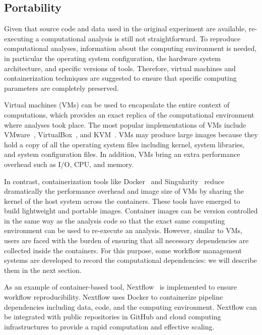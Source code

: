 \subsection{Portability}

Given that source code and data used in the original experiment are 
available, re-executing a computational analysis is still not 
straightforward. To reproduce computational analyses, information about the
computing environment is needed, in particular the operating system 
configuration, the hardware system architecture, and specific versions of 
tools. Therefore, virtual machines and containerization techniques are 
suggested to ensure that specific computing parameters are completely 
preserved. 

Virtual machines (VMs) can be used to encapsulate the entire context of 
computations, which provides an exact replica of the computational 
environment where analyses took place. The most popular implementations 
of VMs include VMware~\cite{wiki:vmware}, 
VirtualBox~\cite{watson2008virtualbox}, and KVM~\cite{kivity2007kvm}. 
VMs may produce large images because they hold a copy of all the 
operating system files including kernel, system libraries, and system 
configuration files. In addition, VMs bring an extra 
performance overhead such as I/O, CPU, and memory.

In contrast, containerization tools like 
Docker~\cite{boettiger2015introduction} and 
Singularity~\cite{kurtzer2017singularity} reduce dramatically the 
performance overhead and image size of VMs by sharing the kernel of the 
host system across the containers. These tools have emerged to build 
lightweight and portable images. Container images can be version 
controlled in the same way as the analysis code so that the exact same 
computing environment can be used to re-execute an analysis. However, 
similar to VMs, users are faced with the burden of ensuring that all 
necessary dependencies are collected inside the containers. For this 
purpose, some workflow management systems are developed to record the 
computational dependencies: we will describe them in the next section. 

As an example of container-based tool, Nextflow~\cite{di2017nextflow} 
is implemented to ensure workflow reproducibility. Nextflow uses Docker 
to containerize pipeline dependencies including data, code, and the 
computing environment. Nextflow can be integrated with public 
repositories in GitHub and cloud computing infrastructures to provide a 
rapid computation and effective scaling. 

